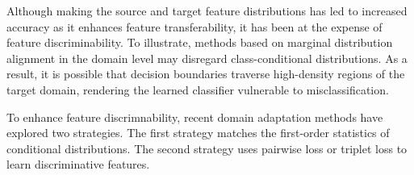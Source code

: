 \documentclass[conference]{IEEEtran}
\begin{document}
Although making the source and target feature distributions has led to increased accuracy as it enhances feature transferability, it has been at the expense of feature discriminability.
To illustrate, methods based on marginal distribution alignment in the domain level may disregard class-conditional distributions.
As a result, it is possible that decision boundaries traverse high-density regions of the target domain, rendering the learned classifier vulnerable to misclassification.

To enhance feature discrimnability, recent domain adaptation methods have explored two strategies. The first strategy matches the first-order statistics of conditional distributions.
The second strategy uses pairwise loss or triplet loss to learn discriminative features.







\end{document}
